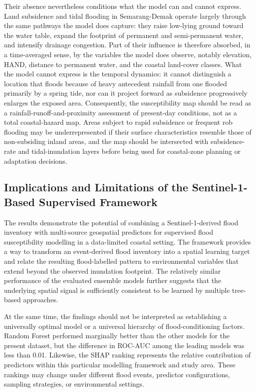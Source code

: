 \documentclass[11pt,twoside]{article}
\begin{document}
Their absence nevertheless conditions what the model can and cannot express.
Land subsidence and tidal flooding in Semarang-Demak operate largely through
the same pathways the model does capture: they raise low-lying ground toward
the water table, expand the footprint of permanent and semi-permanent water,
and intensify drainage congestion. Part of their influence is therefore
absorbed, in a time-averaged sense, by the variables the model does observe,
notably elevation, HAND, distance to permanent water, and the coastal
land-cover classes. What the model cannot express is the temporal dynamics:
it cannot distinguish a location that floods because of heavy antecedent
rainfall from one flooded primarily by a spring tide, nor can it project
forward as subsidence progressively enlarges the exposed area. Consequently,
the susceptibility map should be read as a rainfall-runoff-and-proximity
assessment of present-day conditions, not as a total coastal-hazard map. Areas
subject to rapid subsidence or frequent rob flooding may be underrepresented
if their surface characteristics resemble those of non-subsiding inland areas,
and the map should be intersected with subsidence-rate and tidal-inundation
layers before being used for coastal-zone planning or adaptation decisions.

\subsection{Implications and Limitations of the Sentinel-1-Based Supervised Framework}\label{implications-limitations}

The results demonstrate the potential of combining a Sentinel-1-derived flood inventory with multi-source geospatial predictors for supervised flood susceptibility modelling in a data-limited coastal setting. The framework provides a way to transform an event-derived flood inventory into a spatial learning target and relate the resulting flood-labelled pattern to environmental variables that extend beyond the observed inundation footprint. The relatively similar performance of the evaluated ensemble models further suggests that the underlying spatial signal is sufficiently consistent to be learned by multiple tree-based approaches.

At the same time, the findings should not be interpreted as establishing a universally optimal model or a universal hierarchy of flood-conditioning factors. Random Forest performed marginally better than the other models for the present dataset, but the difference in ROC-AUC among the leading models was less than 0.01. Likewise, the SHAP ranking represents the relative contribution of predictors within this particular modelling framework and study area. These rankings may change under different flood events, predictor configurations, sampling strategies, or environmental settings.
\end{document}
